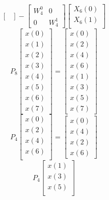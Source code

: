 \documentclass[journal,12pt,twocolumn]{IEEEtran}
\renewcommand\thesection{\arabic{section}}
\begin{document}
\begin{enumerate}[label=\arabic*.,ref=\thesection.\theenumi]
\begin{equation}
\begin{bmatrix}
		\end{bmatrix}
		-
		\begin{bmatrix}
			W^{0}_{4} & 0\\
			0 & W^{1}_{4}
		\end{bmatrix}
		\begin{bmatrix}
			X_{6}(0) \\ 
			X_{6}(1) \\ 
		\end{bmatrix}
	\end{equation}
	\begin{equation}
		P_{8}
		\begin{bmatrix}
			x(0) \\ 
			x(1) \\ 
			x(2) \\ 
			x(3) \\ 
			x(4) \\ 
			x(5) \\
			x(6) \\
			x(7)
		\end{bmatrix}
		= 
		\begin{bmatrix}
			x(0) \\ 
			x(2) \\ 
			x(4) \\ 
			x(6) \\
			x(1) \\ 
			x(3) \\ 
			x(5) \\
			x(7)
		\end{bmatrix}
	\end{equation}
	\begin{equation}
		P_{4}
		\begin{bmatrix}
			x(0) \\ 
			x(2) \\ 
			x(4) \\ 
			x(6) \\
		\end{bmatrix}
		= 
		\begin{bmatrix}
			x(0) \\ 
			x(4) \\ 
			x(2) \\
			x(6)
		\end{bmatrix}
	\end{equation}
	\begin{equation}
		P_{4}
		\begin{bmatrix}
			x(1) \\ 
			x(3) \\ 
			x(5) \\

\end{bmatrix}
\end{equation}
\end{enumerate}
\end{document}
